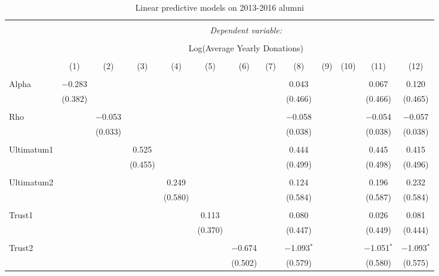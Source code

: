 \newpage

\begin{table}[!htbp] \centering 
  \caption{Linear predictive models on 2013-2016 alumni} 
  \label{} 
    \begin{adjustbox}{width=\textwidth}
\begin{tabular}{@{\extracolsep{5pt}}lcccccccccccc} 
\\[-1.8ex]\hline 
\hline \\[-1.8ex] 
 & \multicolumn{12}{c}{\textit{Dependent variable:}} \\ 
\cline{2-13} 
\\[-1.8ex] & \multicolumn{12}{c}{Log(Average Yearly Donations)} \\ 
\\[-1.8ex] & (1) & (2) & (3) & (4) & (5) & (6) & (7) & (8) & (9) & (10) & (11) & (12)\\ 
\hline \\[-1.8ex] 
 Alpha & $-$0.283 &  &  &  &  &  &  & 0.043 &  &  & 0.067 & 0.120 \\ 
  & (0.382) &  &  &  &  &  &  & (0.466) &  &  & (0.466) & (0.465) \\ 
  & & & & & & & & & & & & \\ 
 Rho &  & $-$0.053 &  &  &  &  &  & $-$0.058 &  &  & $-$0.054 & $-$0.057 \\ 
  &  & (0.033) &  &  &  &  &  & (0.038) &  &  & (0.038) & (0.038) \\ 
  & & & & & & & & & & & & \\ 
 Ultimatum1 &  &  & 0.525 &  &  &  &  & 0.444 &  &  & 0.445 & 0.415 \\ 
  &  &  & (0.455) &  &  &  &  & (0.499) &  &  & (0.498) & (0.496) \\ 
  & & & & & & & & & & & & \\ 
 Ultimatum2 &  &  &  & 0.249 &  &  &  & 0.124 &  &  & 0.196 & 0.232 \\ 
  &  &  &  & (0.580) &  &  &  & (0.584) &  &  & (0.587) & (0.584) \\ 
  & & & & & & & & & & & & \\ 
 Trust1 &  &  &  &  & 0.113 &  &  & 0.080 &  &  & 0.026 & 0.081 \\ 
  &  &  &  &  & (0.370) &  &  & (0.447) &  &  & (0.449) & (0.444) \\ 
  & & & & & & & & & & & & \\ 
 Trust2 &  &  &  &  &  & $-$0.674 &  & $-$1.093$^{*}$ &  &  & $-$1.051$^{*}$ & $-$1.093$^{*}$ \\ 
  &  &  &  &  &  & (0.502) &  & (0.579) &  &  & (0.580) & (0.575) \\ 

\end{tabular}
\end{adjustbox}
\end{table}
